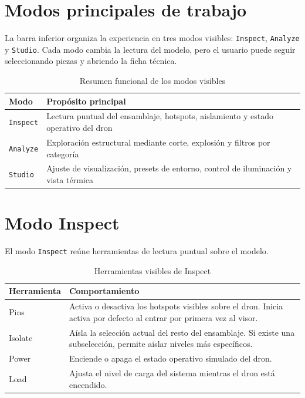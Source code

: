 \documentclass[12pt,letterpaper]{article}
\begin{document}
\section{Modos principales de trabajo}
La barra inferior organiza la experiencia en tres modos visibles: \texttt{Inspect}, \texttt{Analyze} y \texttt{Studio}. Cada modo cambia la lectura del modelo, pero el usuario puede seguir seleccionando piezas y abriendo la ficha técnica.

\begin{table}[htbp!]
\centering
\caption{Resumen funcional de los modos visibles}
\begin{tabular}{p{3.2cm}p{10.6cm}}
\toprule
\textbf{Modo} & \textbf{Propósito principal} \\
\midrule
\texttt{Inspect} & Lectura puntual del ensamblaje, hotspots, aislamiento y estado operativo del dron \\
\texttt{Analyze} & Exploración estructural mediante corte, explosión y filtros por categoría \\
\texttt{Studio} & Ajuste de visualización, presets de entorno, control de iluminación y vista térmica \\
\bottomrule
\end{tabular}
\end{table}

\section{Modo Inspect}
El modo \texttt{Inspect} reúne herramientas de lectura puntual sobre el modelo.

\begin{table}[htbp!]
\centering
\caption{Herramientas visibles de Inspect}
\begin{tabular}{p{3cm}p{10.8cm}}
\toprule
\textbf{Herramienta} & \textbf{Comportamiento} \\
\midrule
Pins & Activa o desactiva los hotspots visibles sobre el dron. Inicia activa por defecto al entrar por primera vez al visor. \\
Isolate & Aísla la selección actual del resto del ensamblaje. Si existe una subselección, permite aislar niveles más específicos. \\
Power & Enciende o apaga el estado operativo simulado del dron. \\
Load & Ajusta el nivel de carga del sistema mientras el dron está encendido. \\
\bottomrule
\end{tabular}
\end{table}
\end{document}
